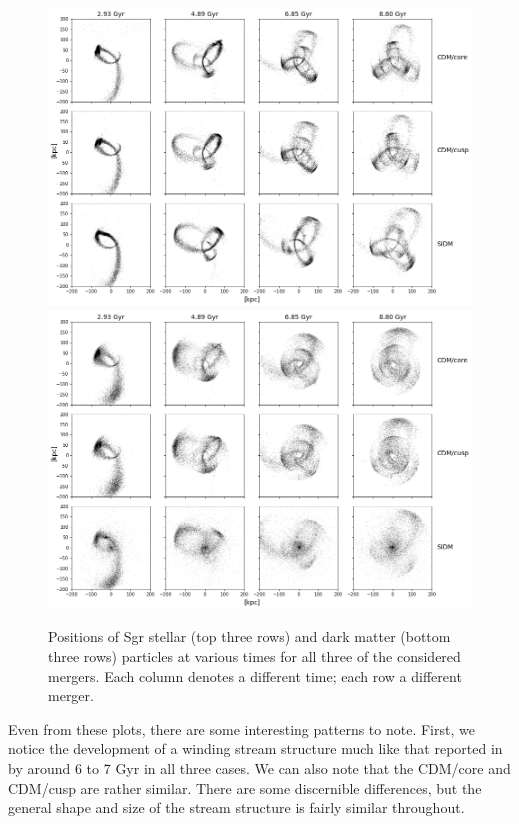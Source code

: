 \begin{figure}
    \centering
    \includegraphics[width=0.9\linewidth]{figs/stars_bw.png}
    \includegraphics[width=0.9\linewidth]{figs/darks_bw.png}
    \caption{%
        Positions of Sgr stellar (top three rows) and dark matter (bottom
        three rows) particles at various times for all three of the considered
        mergers.  Each column denotes a different time; each row a different
        merger.
    }
    \label{fig:inits}
\end{figure}

Even from these plots, there are some interesting patterns to note. First, we
notice the development of a winding stream structure much like that reported
in~\cite{dierickx_predicted_2017} by around 6 to 7 Gyr in all three cases. We
can also note that the CDM/core and CDM/cusp are rather similar. There are some
discernible differences, but the general shape and size of the stream structure
is fairly similar throughout. 

